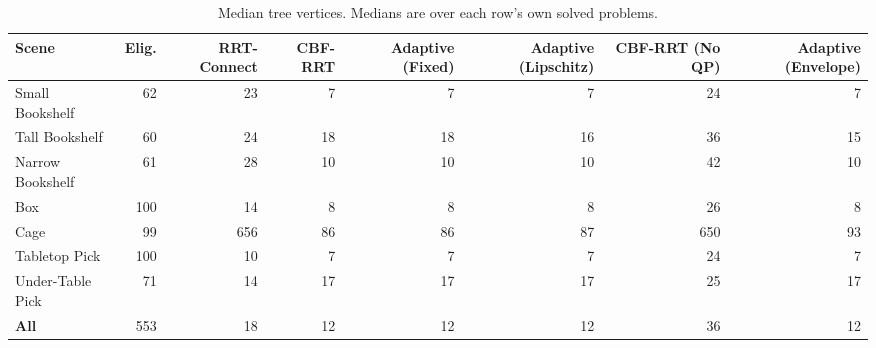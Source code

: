 \begin{table}[t]
  \centering
  \caption{Median tree vertices. Medians are over each row's own solved problems.}
  \label{tab:mbm-per-scene-vertices}
  \small
  \begin{tabular}{lrrrrrrr}
    \toprule
    Scene & Elig. & RRT-Connect & CBF-RRT & Adaptive (Fixed) & Adaptive (Lipschitz) & CBF-RRT (No QP) & Adaptive (Envelope) \\
    \midrule
    Small Bookshelf & 62 & 23 & 7 & 7 & 7 & 24 & 7 \\
    Tall Bookshelf & 60 & 24 & 18 & 18 & 16 & 36 & 15 \\
    Narrow Bookshelf & 61 & 28 & 10 & 10 & 10 & 42 & 10 \\
    Box & 100 & 14 & 8 & 8 & 8 & 26 & 8 \\
    Cage & 99 & 656 & 86 & 86 & 87 & 650 & 93 \\
    Tabletop Pick & 100 & 10 & 7 & 7 & 7 & 24 & 7 \\
    Under-Table Pick & 71 & 14 & 17 & 17 & 17 & 25 & 17 \\
    \midrule
    \textbf{All} & 553 & 18 & 12 & 12 & 12 & 36 & 12 \\
    \bottomrule
  \end{tabular}
\end{table}

